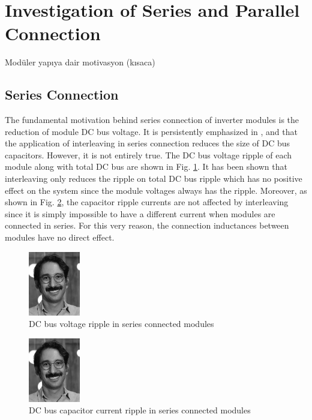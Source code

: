 \section{Investigation of Series and Parallel Connection}\label{sec:SimResults}

Modüler yapıya dair motivasyon (kısaca)

\subsection{Series Connection}
The fundamental motivation behind series connection of inverter modules is the reduction of module DC bus voltage. It is persistently emphasized in \cite{Wang2013}, \cite{Zlwka} and \cite{Wang2015b} that the application of interleaving in series connection reduces the size of DC bus capacitors. However, it is not entirely true. The DC bus voltage ripple of each module along with total DC bus are shown in Fig. \ref{fig:series_volt_ripple}. It has been shown that interleaving only reduces the ripple on total DC bus ripple which has no positive effect on the system since the module voltages always has the ripple. Moreover, as shown in Fig. \ref{fig:series_curr_ripple}, the capacitor ripple currents are not affected by interleaving since it is simply impossible to have a different current when modules are connected in series. For this very reason, the connection inductances between modules have no direct effect.

\begin{figure}[h]
    \centering
    \includegraphics[width=0.2\textwidth]{figures/series_volt_ripple.jpg}
    \caption{DC bus voltage ripple in series connected modules}
    \label{fig:series_volt_ripple}
\end{figure}

\begin{figure}[h]
    \centering
    \includegraphics[width=0.2\textwidth]{figures/series_curr_ripple.jpg}
    \caption{DC bus capacitor current ripple in series connected modules}
    \label{fig:series_curr_ripple}
\end{figure}


